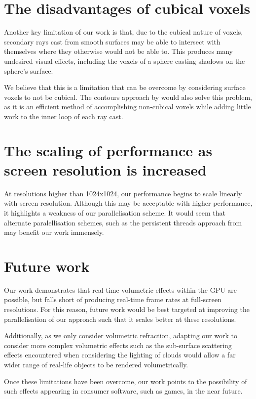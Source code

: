 \section{The disadvantages of cubical voxels}
Another key limitation of our work is that, due to the cubical nature of voxels, secondary rays cast from smooth surfaces may be able to intersect with themselves where they otherwise would not be able to. This produces many undesired visual effects, including the voxels of a sphere casting shadows on the sphere's surface.

We believe that this is a limitation that can be overcome by considering surface voxels to not be cubical. The contours approach by \cite{laine10efficientsvos} would also solve this problem, as it is an efficient method of accomplishing non-cubical voxels while adding little work to the inner loop of each ray cast.

\section{The scaling of performance as screen resolution is increased}
At resolutions higher than 1024x1024, our performance begins to scale linearly with screen resolution. Although this may be acceptable with higher performance, it highlights a weakness of our parallelisation scheme. It would seem that alternate paralellisation schemes, such as the persistent threads approach from \cite{aila2009hpg} may benefit our work immensely.

\section{Future work}
Our work demonstrates that real-time volumetric effects within the GPU are possible, but falls short of producing real-time frame rates at full-screen resolutions. For this reason, future work would be best targeted at improving the parallelisation of our approach such that it scales better at these resolutions.

Additionally, as we only consider volumetric refraction, adapting our work to consider more complex volumetric effects such as the sub-surface scattering effects encountered when considering the lighting of clouds would allow a far wider range of real-life objects to be rendered volumetrically.

Once these limitations have been overcome, our work points to the possibility of such effects appearing in consumer software, such as games, in the near future.